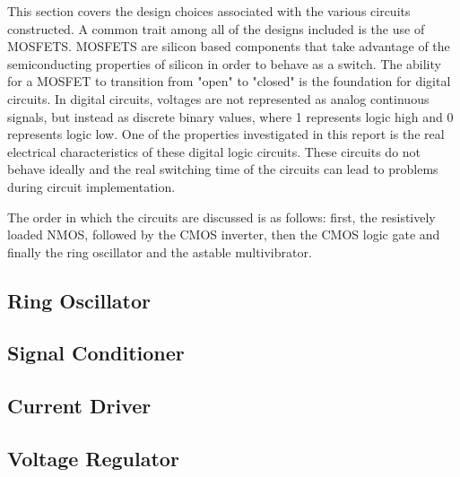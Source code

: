 



This section covers the design choices associated with the various circuits constructed. A common trait among all of the designs included is the use of  MOSFETS. MOSFETS are silicon based components that take advantage of the semiconducting properties of silicon in order to behave as a switch. The ability for a MOSFET to transition from "open" to "closed" is the foundation for digital circuits. In digital circuits, voltages are not represented as analog continuous signals, but instead as discrete binary values, where 1 represents logic high and 0 represents logic low. One of the properties investigated in this report is the real electrical characteristics of these digital logic circuits. These circuits do not behave ideally and the real switching time of the circuits can lead to problems during circuit implementation.

The order in which the circuits are discussed is as follows: first, the resistively loaded NMOS, followed by the CMOS inverter, then the CMOS logic gate and finally the ring oscillator and the astable multivibrator. 

\subsection{Ring Oscillator}


\subsection{Signal Conditioner}


\subsection{Current Driver}


\subsection{Voltage Regulator}

	






